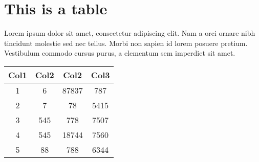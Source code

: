 \chapter{This is a table}
\label{app:appendix2}

Lorem ipsum dolor sit amet, consectetur adipiscing elit. Nam a orci ornare nibh tincidunt molestie sed nec tellus. Morbi non sapien id lorem posuere pretium. Vestibulum commodo cursus purus, a elementum sem imperdiet sit amet.

\begin{center}
	\begin{tabular}{||c c c c||} 
	\hline
	Col1 & Col2 & Col2 & Col3 \\ [0.5ex] 
	\hline\hline
	1 & 6 & 87837 & 787 \\ 
	\hline
	2 & 7 & 78 & 5415 \\
	\hline
	3 & 545 & 778 & 7507 \\
	\hline
	4 & 545 & 18744 & 7560 \\
	\hline
	5 & 88 & 788 & 6344 \\ [1ex] 
	\hline
	\end{tabular}
\end{center}